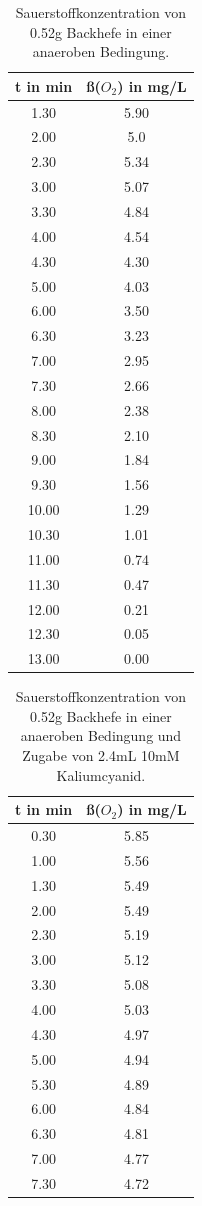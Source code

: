 \documentclass[10pt,a4paper]{article}
\begin{document}
	\begin{table}[H]
		\centering
		\caption{Sauerstoffkonzentration von 0.52g Backhefe in einer anaeroben Bedingung.}
		\label{tab:O2 Backhefe ohne KCN}
		\begin{tabular}{cc}
			\toprule
			t in min& ß($O_2$) in mg/L\\
			\midrule
			1.30 & 5.90\\
			2.00 & 5.0\\
			2.30 & 5.34\\
			3.00 & 5.07\\
			3.30 & 4.84 \\
			4.00 & 4.54 \\
			4.30 & 4.30 \\
			5.00 & 4.03 \\
			6.00 & 3.50 \\
			6.30 & 3.23\\
			7.00 & 2.95\\
			7.30 & 2.66\\
			8.00 & 2.38\\
			8.30 & 2.10 \\
			9.00 & 1.84\\
			9.30 & 1.56 \\
			10.00 & 1.29\\
			10.30 & 1.01\\
			11.00 & 0.74\\
			11.30 & 0.47\\
			12.00 & 0.21\\
			12.30 & 0.05\\
			13.00 & 0.00\\			
			\bottomrule
		\end{tabular}
	\end{table}	
	
	\begin{table}[H]
		\centering
		\caption{Sauerstoffkonzentration von 0.52g Backhefe in einer anaeroben Bedingung und Zugabe von 2.4mL 10mM Kaliumcyanid.}
		\label{tab:O2 Backhefe mit KCN}
		\begin{tabular}{cc}
			\toprule
			t in min& ß($O_2$) in mg/L\\
			\midrule
			0.30 & 5.85\\
			1.00 & 5.56\\
			1.30 & 5.49\\
			2.00 & 5.49\\
			2.30 & 5.19 \\
			3.00 & 5.12 \\
			3.30 & 5.08 \\
			4.00 & 5.03\\
			4.30 & 4.97\\
			5.00 & 4.94 \\
			5.30 & 4.89\\
			6.00 & 4.84\\
			6.30 & 4.81\\
			7.00 & 4.77 \\
			7.30 & 4.72\\
			\bottomrule
		\end{tabular}
	\end{table}	
	
\end{document}
